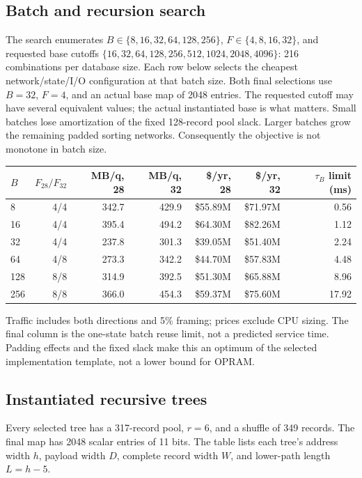 \subsection{Batch and recursion search}
The search enumerates $B\in\{8,16,32,64,128,256\}$,
$F\in\{4,8,16,32\}$, and requested base cutoffs
$\{16,32,64,128,256,512,1024,2048,4096\}$: 216 combinations per database
size. Each row below selects the cheapest network/state/I/O configuration
at that batch size. Both final selections use $B=32$, $F=4$, and an actual
base map of 2048 entries. The requested cutoff may have several equivalent
values; the actual instantiated base is what matters. Small batches lose
amortization of the fixed 128-record pool slack. Larger batches grow the
remaining padded sorting networks. Consequently the objective is not
monotone in batch size.

\begin{center}\small
\begin{tabular}{lrrrrrr}\toprule
$B$ & $F_{28}/F_{32}$ & MB/q, 28 & MB/q, 32 & \$/yr, 28 & \$/yr, 32 & $\tau_B$ limit (ms)\\\midrule
8 & 4/4 & 342.7 & 429.9 & \$55.89M & \$71.97M & 0.56\\
16 & 4/4 & 395.4 & 494.2 & \$64.30M & \$82.26M & 1.12\\
32 & 4/4 & 237.8 & 301.3 & \$39.05M & \$51.40M & 2.24\\
64 & 4/8 & 273.3 & 342.2 & \$44.70M & \$57.83M & 4.48\\
128 & 8/8 & 314.9 & 392.5 & \$51.30M & \$65.88M & 8.96\\
256 & 8/8 & 366.0 & 454.3 & \$59.37M & \$75.60M & 17.92\\
\bottomrule\end{tabular}
\end{center}

Traffic includes both directions and 5\% framing;
prices exclude CPU sizing. The final column is the one-state batch reuse
limit, not a predicted service time. Padding effects and the fixed slack
make this an optimum of the selected implementation template, not a lower
bound for OPRAM.

\subsection{Instantiated recursive trees}
Every selected tree has a 317-record pool, $r=6$, and a shuffle of 349
records. The final map has 2048 scalar entries of 11 bits. The table lists
each tree's address width $h$, payload width $D$, complete record width $W$,
and lower-path length $L=h-5$.

